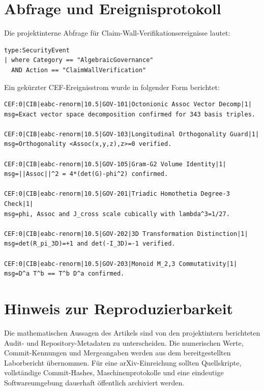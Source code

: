 \documentclass[11pt,a4paper]{article}
\theoremstyle{definition}
\begin{document}
\appendix

\section{Abfrage und Ereignisprotokoll}

Die projektinterne Abfrage für Claim-Wall-Verifikationsereignisse lautet:
\begin{lstlisting}[style=logstyle]
type:SecurityEvent
| where Category == "AlgebraicGovernance"
  AND Action == "ClaimWallVerification"
\end{lstlisting}

Ein gekürzter CEF-Ereignisstrom wurde in folgender Form berichtet:
\begin{lstlisting}[style=logstyle]
CEF:0|CIB|eabc-renorm|10.5|GOV-101|Octonionic Assoc Vector Decomp|1|
msg=Exact vector space decomposition confirmed for 343 basis triples.

CEF:0|CIB|eabc-renorm|10.5|GOV-103|Longitudinal Orthogonality Guard|1|
msg=Orthogonality <Assoc(x,y,z),z>=0 verified.

CEF:0|CIB|eabc-renorm|10.5|GOV-105|Gram-G2 Volume Identity|1|
msg=||Assoc||^2 = 4*(det(G)-phi^2) confirmed.

CEF:0|CIB|eabc-renorm|10.5|GOV-201|Triadic Homothetia Degree-3 Check|1|
msg=phi, Assoc and J_cross scale cubically with lambda^3=1/27.

CEF:0|CIB|eabc-renorm|10.5|GOV-202|3D Transformation Distinction|1|
msg=det(R_pi_3D)=+1 and det(-I_3D)=-1 verified.

CEF:0|CIB|eabc-renorm|10.5|GOV-203|Monoid M_2,3 Commutativity|1|
msg=D^a T^b == T^b D^a confirmed.
\end{lstlisting}

\section*{Hinweis zur Reproduzierbarkeit}

Die mathematischen Aussagen des Artikels sind von den projektintern
berichteten Audit- und Repository-Metadaten zu unterscheiden. Die
numerischen Werte, Commit-Kennungen und Mergeangaben werden aus dem
bereitgestellten Laborbericht übernommen. Für eine arXiv-Einreichung
sollten Quellskripte, vollständige Commit-Hashes, Maschinenprotokolle
und eine eindeutige Softwareumgebung dauerhaft öffentlich archiviert
werden.
\end{document}
